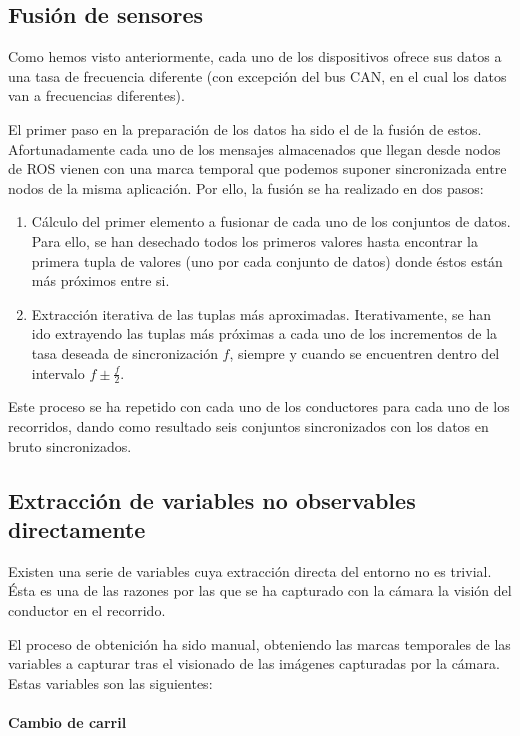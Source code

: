 \subsection{Fusión de sensores}

Como hemos visto anteriormente, cada uno de los dispositivos ofrece sus datos a una tasa de frecuencia diferente (con excepción del bus CAN, en el cual los datos van a frecuencias diferentes).

El primer paso en la preparación de los datos ha sido el de la fusión de estos. Afortunadamente cada uno de los mensajes almacenados que llegan desde nodos de ROS vienen con una marca temporal que podemos suponer sincronizada entre nodos de la misma aplicación. Por ello, la fusión se ha realizado en dos pasos:

\begin{enumerate}
	\item Cálculo del primer elemento a fusionar de cada uno de los conjuntos de datos. Para ello, se han desechado todos los primeros valores hasta encontrar la primera tupla de valores (uno por cada conjunto de datos) donde éstos están más próximos entre si.
	\item Extracción iterativa de las tuplas más aproximadas. Iterativamente, se han ido extrayendo las tuplas más próximas a cada uno de los incrementos de la tasa deseada de sincronización $f$, siempre y cuando se encuentren dentro del intervalo $f \pm \frac{f}{2}$.
\end{enumerate}

Este proceso se ha repetido con cada uno de los conductores para cada uno de los recorridos, dando como resultado seis conjuntos sincronizados con los datos en bruto sincronizados.

\subsection{Extracción de variables no observables directamente}

Existen una serie de variables cuya extracción directa del entorno no es trivial. Ésta es una de las razones por las que se ha capturado con la cámara la visión del conductor en el recorrido.

El proceso de obtenición ha sido manual, obteniendo las marcas temporales de las variables a capturar tras el visionado de las imágenes capturadas por la cámara. Estas variables son las siguientes:

\paragraph{Cambio de carril}

